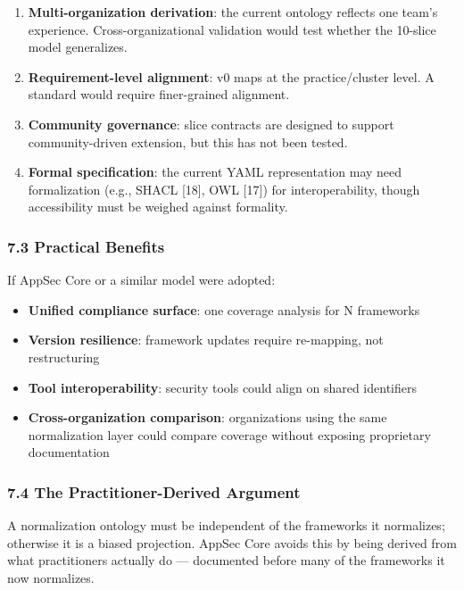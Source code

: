 \documentclass[
]{article}
\providecommand{\tightlist}{%
  \setlength{\itemsep}{0pt}\setlength{\parskip}{0pt}}
\begin{document}
\begin{enumerate}
\def\labelenumi{\arabic{enumi}.}
\tightlist
\item
  \textbf{Multi-organization derivation}: the current ontology reflects
  one team's experience. Cross-organizational validation would test
  whether the 10-slice model generalizes.
\item
  \textbf{Requirement-level alignment}: v0 maps at the practice/cluster
  level. A standard would require finer-grained alignment.
\item
  \textbf{Community governance}: slice contracts are designed to support
  community-driven extension, but this has not been tested.
\item
  \textbf{Formal specification}: the current YAML representation may
  need formalization (e.g., SHACL {[}18{]}, OWL {[}17{]}) for
  interoperability, though accessibility must be weighed against
  formality.
\end{enumerate}

\subsubsection{7.3 Practical Benefits}\label{practical-benefits}

If AppSec Core or a similar model were adopted:

\begin{itemize}
\tightlist
\item
  \textbf{Unified compliance surface}: one coverage analysis for N
  frameworks
\item
  \textbf{Version resilience}: framework updates require re-mapping, not
  restructuring
\item
  \textbf{Tool interoperability}: security tools could align on shared
  identifiers
\item
  \textbf{Cross-organization comparison}: organizations using the same
  normalization layer could compare coverage without exposing
  proprietary documentation
\end{itemize}

\subsubsection{7.4 The Practitioner-Derived
Argument}\label{the-practitioner-derived-argument}

A normalization ontology must be independent of the frameworks it
normalizes; otherwise it is a biased projection. AppSec Core avoids this
by being derived from what practitioners actually do --- documented
before many of the frameworks it now normalizes.
\end{document}
